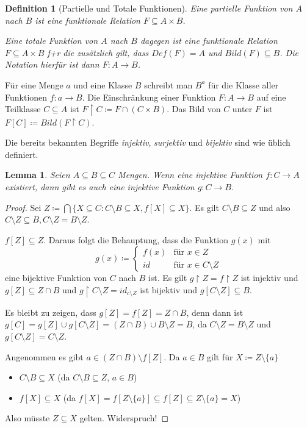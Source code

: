 \documentclass[german]{article}
\theoremstyle{break}
\theoremstyle{def_style}
\newtheorem{definition}{Definition}[section]
\theoremstyle{def_style}
\theoremstyle{lemma_style}
\newtheorem{lemma}{Lemma}[subsection]
\begin{document}
\begin{definition}[Partielle und Totale Funktionen]
	Eine \textit{partielle Funktion} von $A$ nach $B$ ist eine funktionale Relation $F\subseteq A\times B$.
	
	Eine \textit{totale Funktion} von $A$ nach $B$ dagegen ist eine funktionale Relation $F\subseteq A\times B$ f+r die zusätzlich gilt, dass $Def(F)=A$ und $Bild(F)\subseteq B$. Die Notation hierfür ist dann $F:A \to B$.
\end{definition}

Für eine Menge $a$ und eine Klasse $B$ schreibt man $B^a$ für die Klasse aller Funktionen $f:a\to B$. Die Einschränkung einer Funktion $F: A\to B$ auf eine Teilklasse $C\subseteq A$ ist $F\upharpoonright C\coloneqq F\cap(C\times B)$. Das Bild von $C$ unter $F$ ist $F[C]\coloneqq Bild(F\upharpoonright C)$.

Die bereits bekannten Begriffe \textit{injektiv}, \textit{surjektiv} und \textit{bijektiv} sind wie üblich definiert.

\begin{lemma}
	Seien $A\subseteq B \subseteq C$ Mengen. Wenn eine injektive Funktion $f:C\to A$ existiert, dann gibt es auch eine injektive Funktion $g:C\to B$.
	\label{CursedGeschachtelteMengenFunktionenLemma}
\end{lemma}
\begin{proof}
	Sei $Z\coloneqq \bigcap \{X\subseteq C : C\setminus B\subseteq X, f[X]\subseteq X\}$. Es gilt $C\setminus B\subseteq Z$ und also $C\setminus Z\subseteq B, C\setminus Z = B\setminus Z$.
	
	$f[Z]\subseteq Z$. Daraus folgt die Behauptung, dass die Funktion $g(x)$ mit $$g(x)\coloneqq\begin{cases} f(x) & \text{für } x \in Z \\id & \text{für } x \in C \setminus Z \end{cases}$$
	eine bijektive Funktion von $C$ nach $B$ ist. Es gilt $g \upharpoonright Z=f\upharpoonright Z$ ist injektiv und $g[Z]\subseteq Z \cap B$ und $g \upharpoonright C \setminus Z = id_{c\setminus Z}$ ist bijektiv und $g[C\setminus Z] \subseteq B$.
	
	Es bleibt zu zeigen, dass $g[Z]=f[Z]=Z\cap B$, denn dann ist $g[C]=g[Z]\cup g[C\setminus Z]=(Z\cap B)\cup B\setminus Z=B$, da $C\setminus Z = B \setminus Z$ und $g[C\setminus Z]=C\setminus Z$.
	
	Angenommen es gibt $a\in (Z\cap B)\setminus f[Z]$. Da $a\in B$ gilt für $X\coloneqq Z \setminus \{a\}$
	\begin{itemize}
		\item $C\setminus B\subseteq X$ (da $C\setminus B \subseteq Z$, $a\in B$)
		\item $f[X]\subseteq X$ (da $f[X]=f[Z\setminus \{a\}]\subseteq f[Z] \subseteq Z\setminus \{a\}=X$)
	\end{itemize}
	Also müsste $Z \subseteq X$ gelten. Widerspruch!
\end{proof}
\end{document}
